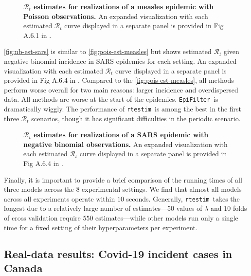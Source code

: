 \documentclass[10pt,letterpaper]{article}
\def\RtEstim{\texttt{rtestim}}
\def\EpiFilter{\texttt{EpiFilter}}
\def\calR{\mathcal{R}}
\begin{document}
\begin{figure}[!t]
  \centering
  \caption{{\bf $\calR_t$ estimates for realizations of a measles epidemic with
    Poisson observations.} An expanded visualization with each estimated
    $\calR_t$ curve displayed in a separate panel is provided in Fig A.6.1 in
    .}
  \label{fig:pois-est-measles}
\end{figure}

\autoref{fig:nb-est-sars} is similar to \autoref{fig:pois-est-measles} but
shows estimated $\calR_t$ given negative binomial incidence in SARS epidemics
for each setting. An expanded visualization with each estimated $\calR_t$ curve
displayed in a separate panel is provided in Fig A.6.4 in .
Compared to the \autoref{fig:pois-est-measles}, all methods perform worse
overall for two main reasons: larger incidence and overdispersed data. All
methods are worse at the start of the epidemics. \EpiFilter\ is dramatically
wiggly. The performance of \RtEstim\ is among the best
in the first three $\calR_t$ scenarios, though it has
significant difficulties in the periodic scenario. 

\begin{figure}[!t]
  \centering
  \caption{
    {\bf $\calR_t$ estimates for realizations of a SARS epidemic with
    negative binomial observations.} An expanded visualization with each estimated
    $\calR_t$ curve displayed in a separate panel is provided in Fig A.6.4 in
    .}
  \label{fig:nb-est-sars}
\end{figure}

Finally, it is important to provide a brief comparison of the running times of
all three models across the $8$ experimental settings. We find that almost all
models across all experiments operate within $10$ seconds. Generally, \RtEstim\
takes the longest due to a relatively large number of estimates---$50$ values of
$\lambda$ and $10$ folds of cross validation require $550$ estimates---while
other models run only a single time for a fixed setting of their hyperparameters
per experiment. 


\subsection{Real-data results: Covid-19 incident cases in Canada}
\end{document}

